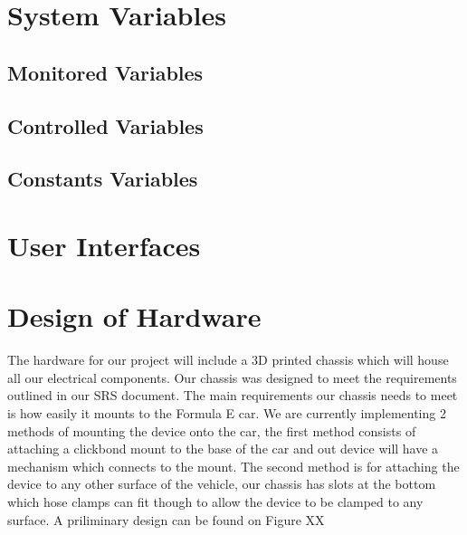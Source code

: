 \documentclass[12pt, titlepage]{article}
\begin{document}
\section{System Variables}


\subsection{Monitored Variables}

\subsection{Controlled Variables}

\subsection{Constants Variables}

\section{User Interfaces}


\section{Design of Hardware}

The hardware for our project will include a 3D printed chassis which will house all our electrical components. Our chassis was designed to meet the requirements outlined in our SRS document. The main requirements our chassis needs to meet is how easily it mounts to the Formula E car. We are currently implementing 2 methods of mounting the device onto the car, the first method consists of attaching a clickbond mount to the base of the car and out device will have a mechanism which connects to the mount. The second method is for attaching the device to any other surface of the vehicle, our chassis has slots at the bottom which hose clamps can fit though to allow the device to be clamped to any surface. A priliminary design can be found on Figure XX

\end{document}
